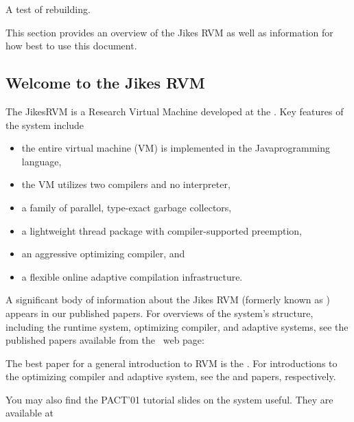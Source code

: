 A test of rebuilding.

This section provides an overview of the Jikes RVM as well as
information for how best to use this document.

\subsection{Welcome to the Jikes RVM}

The Jikes\JikesTMFootnote RVM is a Research Virtual Machine 
 developed at the 
.  Key
features of the system include
\begin{itemize}
\item the entire virtual machine (VM) is implemented in the
  Java\JavaTMFootnote  programming language,
\item the VM utilizes two compilers and no interpreter,
\item a family of parallel, type-exact garbage collectors,
\item a lightweight thread package with compiler-supported preemption,
\item an aggressive optimizing compiler, and 
\item a flexible online adaptive compilation infrastructure.
\end{itemize}

A significant body of information about the Jikes RVM 
(formerly known as 
\xlink{\jp}{\JalapenoHomeURL}) appears 
in our published
papers.  For overviews of the system's structure, including the runtime system,
optimizing compiler, and adaptive systems, see the published papers
available from the \jrvm\ web page:
\begin{quote}
\xlink{{\RVMPubsURL}}{\RVMPubsURL}
\end{quote}

The best paper for a general introduction to RVM is 
the 
.  
For introductions to the
optimizing compiler and adaptive system, see the 
{\JavaGrandePaperURL}
 and 
{\OOPSLAPaperURL}  
papers, respectively.

You may also find the PACT'01 tutorial slides on the system useful.
They are available at
\begin{quote}
\xlink{{\RVMSlidesURL}}{\RVMSlidesURL}
\end{quote}

